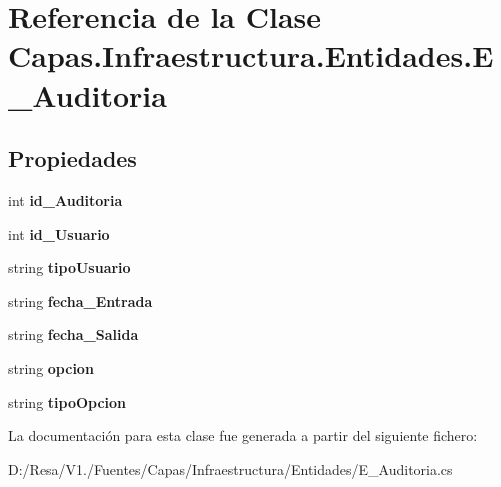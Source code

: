 \section{Referencia de la Clase Capas.\+Infraestructura.\+Entidades.\+E\+\_\+\+Auditoria}
\label{class_capas_1_1_infraestructura_1_1_entidades_1_1_e___auditoria}
\subsection*{Propiedades}
\begin{DoxyCompactItemize}
\item 
int {\bfseries id\+\_\+\+Auditoria}\hspace{0.3cm}{\ttfamily  [get, set]}\label{class_capas_1_1_infraestructura_1_1_entidades_1_1_e___auditoria_a44a6b33cc54d4009f95588946460dcf1}

\item 
int {\bfseries id\+\_\+\+Usuario}\hspace{0.3cm}{\ttfamily  [get, set]}\label{class_capas_1_1_infraestructura_1_1_entidades_1_1_e___auditoria_a2a9d8eec7ad392f173d7eeab4d731ef7}

\item 
string {\bfseries tipo\+Usuario}\hspace{0.3cm}{\ttfamily  [get, set]}\label{class_capas_1_1_infraestructura_1_1_entidades_1_1_e___auditoria_a307a7e81670b42ad3d0c709310c488ef}

\item 
string {\bfseries fecha\+\_\+\+Entrada}\hspace{0.3cm}{\ttfamily  [get, set]}\label{class_capas_1_1_infraestructura_1_1_entidades_1_1_e___auditoria_abd2e24e27ca0aa69ce687db3d3f2b10f}

\item 
string {\bfseries fecha\+\_\+\+Salida}\hspace{0.3cm}{\ttfamily  [get, set]}\label{class_capas_1_1_infraestructura_1_1_entidades_1_1_e___auditoria_addd7d2f8b73bf37355c39ba04d9ef627}

\item 
string {\bfseries opcion}\hspace{0.3cm}{\ttfamily  [get, set]}\label{class_capas_1_1_infraestructura_1_1_entidades_1_1_e___auditoria_a917af32cfda6e64ed21952ecb8c77238}

\item 
string {\bfseries tipo\+Opcion}\hspace{0.3cm}{\ttfamily  [get, set]}\label{class_capas_1_1_infraestructura_1_1_entidades_1_1_e___auditoria_a022ba28602ae3548c3ec9f5ea6ca21d1}

\end{DoxyCompactItemize}


La documentación para esta clase fue generada a partir del siguiente fichero\+:\begin{DoxyCompactItemize}
\item 
D\+:/\+Resa/\+V1./\+Fuentes/\+Capas/\+Infraestructura/\+Entidades/E\+\_\+\+Auditoria.\+cs\end{DoxyCompactItemize}
